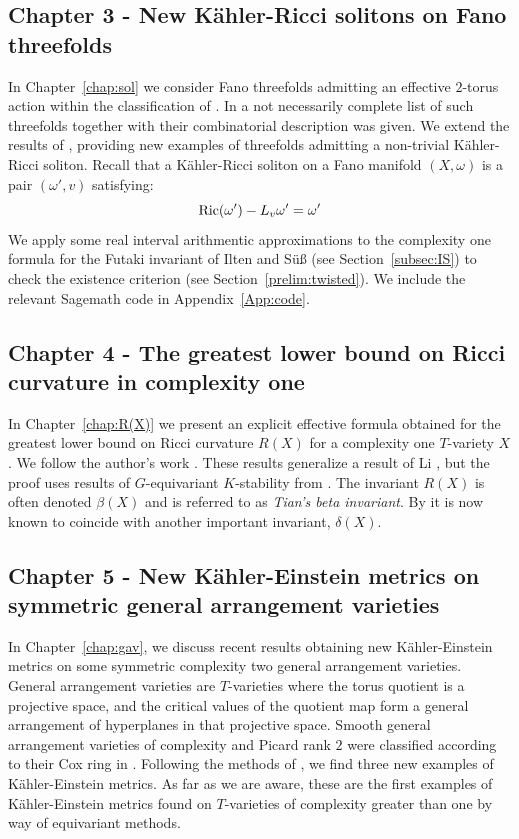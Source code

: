 \subsection*{Chapter 3 - New K\"ahler-Ricci solitons on Fano threefolds} \label{content:riccisolitons}
In Chapter~\ref{chap:sol} we consider Fano threefolds admitting an effective \(2\)-torus action within the classification of \cite{mori1981classification}. In \cite{suss2013fano} a not necessarily complete list of such threefolds together with their combinatorial description was given. We extend the results of \cite{ilten2015}, providing new examples of threefolds admitting a non-trivial K\"ahler-Ricci soliton. Recall that a K\"ahler-Ricci soliton on a Fano manifold \((X,\omega)\) is a pair \((\omega',v)\) satisfying:
\[
\mathop{\rm Ric}\nolimits(\omega') - L_v \omega' = \omega'
\]
We apply some real interval arithmentic approximations to the complexity one formula for the Futaki invariant of Ilten and S{\"u}{\ss} (see Section~\ref{subsec:IS}) to check the existence criterion \cite{datar2016kahler} (see Section~\ref{prelim:twisted}). We include the relevant Sagemath code in Appendix~\ref{App:code}.
\subsection*{Chapter 4 - The greatest lower bound on Ricci curvature in complexity one} \label{content:R(X)}
In Chapter~\ref{chap:R(X)} we present an explicit effective formula obtained for the greatest lower bound on Ricci curvature \(R(X)\) for a complexity one \(T\)-variety \(X\). We follow the author's work \cite{cable2019greatest}. These results generalize a result of Li \cite{li2009greatest}, but the proof uses results of \(G\)-equivariant \(K\)-stability from \cite{datar2016kahler}. The invariant \(R(X)\) is often denoted \(\beta(X)\) and is referred to as \textit{Tian's beta invariant}. By \cite{} it is now known to coincide with another important invariant, \(\delta(X)\).
\subsection*{Chapter 5 - New K\"ahler-Einstein metrics on symmetric general arrangement varieties} \label{content:generalarrangement}
In Chapter~\ref{chap:gav}, we discuss recent results obtaining new K\"ahler-Einstein metrics on some symmetric complexity two general arrangement varieties. General arrangement varieties are \(T\)-varieties where the torus quotient is a projective space, and the critical values of the quotient map form a general arrangement of hyperplanes in that projective space. Smooth general arrangement varieties of complexity and Picard rank \(2\) were classified according to their Cox ring in \cite{hausen2018torus}. Following the methods of \cite{Su13}, we find three new examples of K\"ahler-Einstein metrics. As far as we are aware, these are the first examples of K\"ahler-Einstein metrics found on \(T\)-varieties of complexity greater than one by way of equivariant methods.